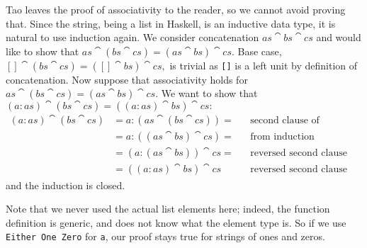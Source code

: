 Tao leaves the proof of associativity to the reader, so we cannot avoid proving that. Since the string, being a list in Haskell, is an inductive data type,
it is natural to use induction again. We consider concatenation $as \cat bs \cat cs$ and would like to show that $as \cat (bs \cat cs) = (as \cat bs) \cat cs.$
Base case, $[] \cat (bs \cat cs) = ([] \cat bs) \cat cs,$ is trivial as \texttt{[]} is a left unit by definition of concatenation.
Now suppose that associativity holds for $as \cat (bs \cat cs) = (as \cat bs) \cat cs.$ We want to show that $(a : as) \cat (bs \cat cs) = ((a : as) \cat bs) \cat cs:$
\begin{align*}
(a : as) \cat (bs \cat cs) &= a : (as \cat (bs \cat cs)) = && \text{second clause of definition} \\
                           &= a : ((as \cat bs) \cat cs) = && \text{from induction hypothesis} \\
                           &= (a : (as \cat bs)) \cat cs = && \text{reversed second clause} \\
                           &= ((a : as) \cat bs) \cat cs   && \text{reversed second clause again} 
\end{align*}
and the induction is closed.

Note that we never used the actual list elements here; indeed, the function definition is generic, and does not know what the element type is. 
So if we use \texttt{Either One Zero} for \texttt{a}, our proof stays true for strings of ones and zeros. 